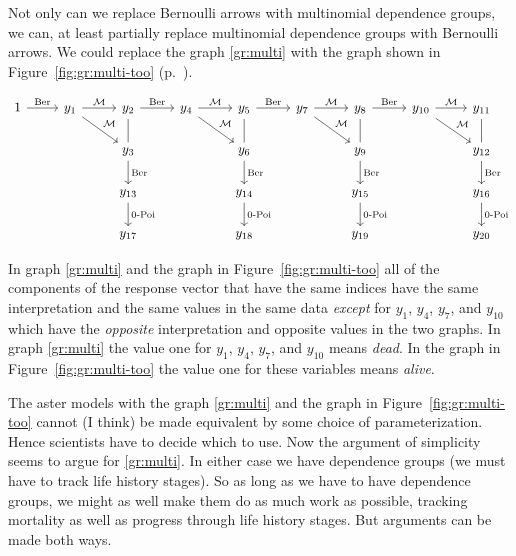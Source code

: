 Not only can we replace Bernoulli arrows with multinomial dependence groups,
we can, at least partially replace multinomial dependence groups with Bernoulli
arrows.  We could replace the graph \eqref{gr:multi} with the graph
shown in Figure~\ref{fig:gr:multi-too} (p.~\pageref{fig:gr:multi-too}).
\begin{sidewaysfigure}
\begin{equation*}
\begin{tikzcd}
  1
  \arrow{r}{\text{Ber}}
  & y_1
  \arrow{r}{\mathcal{M}}
  \arrow{rd}{\mathcal{M}}
  & y_2
  \arrow{r}{\text{Ber}}
  \arrow[dash]{d}
  & y_4
  \arrow{r}{\mathcal{M}}
  \arrow{rd}{\mathcal{M}}
  & y_5
  \arrow[dash]{d}
  \arrow{r}{\text{Ber}}
  & y_7
  \arrow{r}{\mathcal{M}}
  \arrow{rd}{\mathcal{M}}
  & y_8
  \arrow[dash]{d}
  \arrow{r}{\text{Ber}}
  & y_{10}
  \arrow{r}{\mathcal{M}}
  \arrow{rd}{\mathcal{M}}
  & y_{11}
  \arrow[dash]{d}
  \\
  \hphantom{1} & \hphantom{y_1}
  & y_3 \arrow{d}{\text{Ber}}
  & \hphantom{y_4}
  & y_6 \arrow{d}{\text{Ber}}
  & \hphantom{y_7}
  & y_9 \arrow{d}{\text{Ber}}
  & \hphantom{y_{10}}
  & y_{12} \arrow{d}{\text{Ber}}
  \\
  \hphantom{1} & \hphantom{y_1}
  & y_{13} \arrow{d}{\text{0-Poi}}
  & \hphantom{y_4}
  & y_{14} \arrow{d}{\text{0-Poi}}
  & \hphantom{y_7}
  & y_{15} \arrow{d}{\text{0-Poi}}
  & \hphantom{y_{10}}
  & y_{16} \arrow{d}{\text{0-Poi}}
  \\
  \hphantom{1} & \hphantom{y_1}
  & y_{17} 
  & \hphantom{y_4}
  & y_{18}
  & \hphantom{y_7}
  & y_{19}
  & \hphantom{y_{10}}
  & y_{20}
\end{tikzcd}
\end{equation*}
\caption{Alternative to Graph \eqref{gr:multi}.}
\label{fig:gr:multi-too}
\end{sidewaysfigure}
In graph \eqref{gr:multi} and the graph in Figure~\ref{fig:gr:multi-too}
all of the components of the response vector that have the same indices
have the same interpretation and the same values in the same data \emph{except}
for $y_1$,  $y_4$,  $y_7$, and $y_{10}$ which have the \emph{opposite}
interpretation and opposite values in the two graphs.
In graph \eqref{gr:multi} the value one
for $y_1$,  $y_4$,  $y_7$, and $y_{10}$ means \emph{dead}.
In the graph in Figure~\ref{fig:gr:multi-too} the value one
for these variables means \emph{alive}.

The aster models with the graph \eqref{gr:multi} and the graph
in Figure~\ref{fig:gr:multi-too} cannot (I think) be made equivalent
by some choice of parameterization.
Hence scientists have to decide which to use.  Now the argument of simplicity
seems to argue for \eqref{gr:multi}.  In either case we have dependence groups
(we must have to track life history stages).  So as long as we have to have
dependence groups, we might as well make them do as much work as possible,
tracking mortality as well as progress through life history stages.
But arguments can be made both ways.

